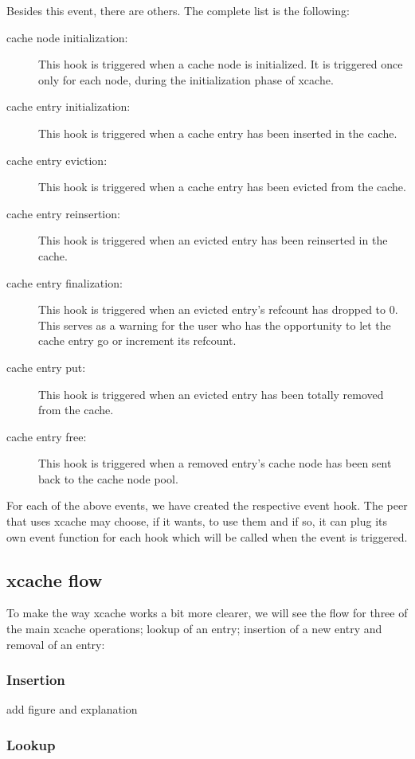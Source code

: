 Besides this event, there are others. The complete list is the following:

\begin{description}
\item[cache node initialization:]
	This hook is triggered when a cache node is initialized. It is 
	triggered once only for each node, during the initialization phase of 
	xcache.
\item[cache entry initialization:]
	This hook is triggered when a cache entry has been inserted in the 
	cache.
\item[cache entry eviction:]
	This hook is triggered when a cache entry has been evicted from the 
	cache.
\item[cache entry reinsertion:]
	This hook is triggered when an evicted entry has been reinserted in the 
	cache.
\item[cache entry finalization:]
	This hook is triggered when an evicted entry's refcount has dropped to 
	0. This serves as a warning for the user who has the opportunity to let 
	the cache entry go or increment its refcount.
\item[cache entry put:]
	This hook is triggered when an evicted entry has been totally removed 
	from the cache.
\item[cache entry free:]
	This hook is triggered when a removed entry's cache node has been sent 
	back to the cache node pool.
\end{description}

For each of the above events, we have created the respective event hook. The 
peer that uses xcache may choose, if it wants, to use them and if so, it can 
plug its own event function for each hook which will be called when the event 
is triggered.

\subsection{xcache flow}

To make the way xcache works a bit more clearer, we will see the flow for three 
of the main xcache operations; lookup of an entry; insertion of a new entry and 
removal of an entry:

\subsubsection{Insertion}

\fixme add figure and explanation

\subsubsection{Lookup}

